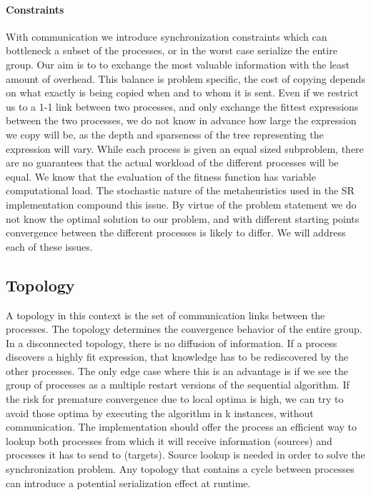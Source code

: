 \paragraph{Constraints}
With communication we introduce synchronization constraints which can bottleneck a subset of the processes, or in the worst case serialize the entire group. Our aim is to to exchange the most valuable information with the least amount of overhead. This balance is problem specific, the cost of copying depends on what exactly is being copied when and to whom it is sent. Even if we restrict us to a 1-1 link between two processes, and only exchange the fittest expressions between the two processes, we do not know in advance how large the expression we copy will be, as the depth and sparseness of the tree representing the expression will vary.
While each process is given an equal sized subproblem, there are no guarantees that the actual workload of the different processes will be equal. We know that the evaluation of the fitness function has variable computational load. The stochastic nature of the metaheuristics used in the SR implementation compound this issue. By virtue of the problem statement we do not know the optimal 
solution to our problem, and with different starting points convergence between the different processes is likely to differ. We will address each of these issues.

\subsection{Topology}
A topology in this context is the set of communication links between the processes. The topology determines the convergence behavior of the entire group. In a disconnected topology, there is no diffusion of information. If a process discovers a highly fit expression, that knowledge has to be rediscovered by the other processes. The only edge case where this is an advantage is if we see the group of processes as a multiple restart versions of the sequential algorithm. If the risk for premature convergence due to local optima is high, we can try to avoid those optima by executing the algorithm in k instances, without communication. 
The implementation should offer the process an efficient way to lookup both processes from which it will receive information (sources) and processes it has to send to (targets). Source lookup is needed in order to solve the synchronization problem. Any topology that contains a cycle between processes can introduce a potential serialization effect at runtime.

